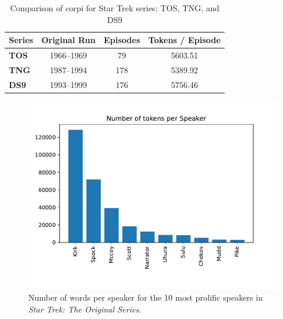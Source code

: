 \begin{table}
  \centering
  \renewcommand*{\arraystretch}{1.4}
  \begin{tabular}{l|c|c|c}
    \textbf{Series} & \textbf{Original Run} & \textbf{Episodes} & \textbf{Tokens / Episode} \\
    \hline
    \textbf{TOS} & 1966--1969 & 79 & 5603.51 \\
    \textbf{TNG} & 1987--1994 & 178 & 5389.92 \\
    \textbf{DS9} & 1993--1999 & 176 & 5756.46 \\
  \end{tabular}
  \caption{Comparison of corpi for Star Trek series: TOS, TNG, and DS9}
  \label{table:series-comparison}
\end{table}

\begin{figure}
  \centering
  \includegraphics[width=\columnwidth]{figures/localized/tos_speaker_tokens.pdf}
  \caption{Number of words per speaker for the 10 most prolific speakers in \textit{Star Trek: The Original Series}.}
  \label{fig:tos_speaker_tokens}
\end{figure}

